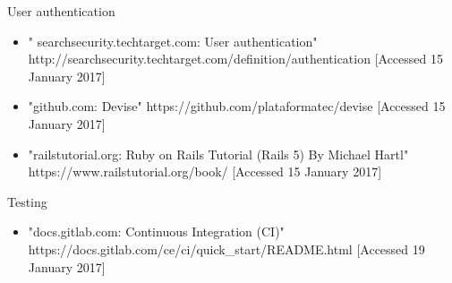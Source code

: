 \documentclass{l3proj}
\begin{document}
\label{authentication}
User authentication

\begin{itemize}

\item " searchsecurity.techtarget.com: User authentication"
\newline http://searchsecurity.techtarget.com/definition/authentication [Accessed 15 January 2017]

\item "github.com: Devise"
\newline https://github.com/plataformatec/devise [Accessed 15 January 2017]

\item "railstutorial.org: Ruby on Rails Tutorial (Rails 5) By Michael Hartl"
\newline https://www.railstutorial.org/book/ [Accessed 15 January 2017]

\end{itemize}

\label{testing}

Testing

\begin{itemize}

\item "docs.gitlab.com: Continuous Integration (CI)"
\newline https://docs.gitlab.com/ce/ci/quick\_start/README.html [Accessed 19 January 2017]

\end{itemize}
\fi
\end{document}

